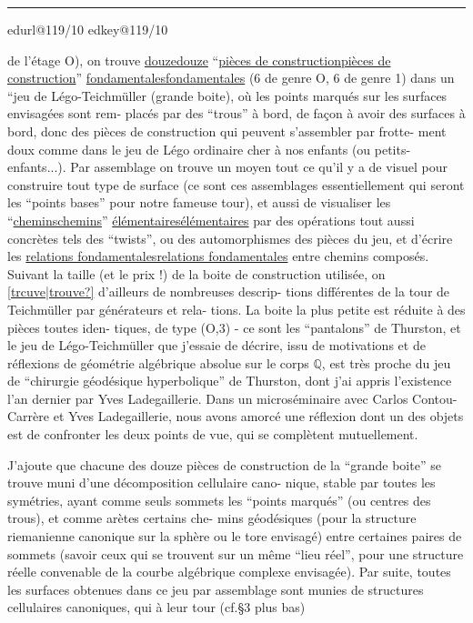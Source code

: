 \documentclass[11pt,a4paper]{article}
\makeatletter
\newif\ifdiplomatic
\newif\ifreading
\newif\ifenglish
\def\CurrentScanURL{}
\def\CurrentPageKey{}
\def\CurrentApparatus{}
\newcounter{appnote}
\newcommand{\scanpage}[1]{%
  \clearpage
  \expandafter\let\expandafter\CurrentScanURL\csname edurl@#1\endcsname
  \expandafter\let\expandafter\CurrentPageKey\csname edkey@#1\endcsname
  \def\CurrentApparatus{}%
  \hypertarget{scan-\CurrentPageKey}{}%
  \typeout{EDITION-SCAN: \CurrentPageKey; PDFPAGE: \the\numexpr\ReadonlyShipoutCounter+1\relax}%
  \ifreading
    \marginnote{\raggedright\scriptsize\sffamily\href{\CurrentScanURL}{119 / \csname edpage@#1\endcsname}}%
  \else
    \noindent{\small\sffamily\href{\CurrentScanURL}{[scan #1]}}\par\smallskip
  \fi}
\newcommand{\mspage}[1]{%
  \ifreading\marginnote{\raggedright\scriptsize\sffamily p.\,#1}[2\baselineskip]%
  \else\noindent{\small\sffamily[p.\,#1]}\par\smallskip\fi}
\let\TextUline\uline
\renewcommand{\uline}[1]{\ifmmode\underline{#1}\else\TextUline{#1}\fi}
\newcommand{\unsure}[1]{\href{\CurrentScanURL}{[#1?]}}
\newcommand{\margin}[1]{%
  \sbox{\MarginalTestBox}{\parbox{\marginparwidth}{\raggedright\footnotesize#1}}%
  \ifdim\dimexpr\ht\MarginalTestBox+\dp\MarginalTestBox\relax>3\baselineskip
    \par\smallskip\noindent\begin{minipage}{\linewidth}\hrule\smallskip
    {\footnotesize\textcolor{HandInk}{\ifenglish Marginal note:\else Note marginale :\fi\ #1}}\smallskip\hrule\end{minipage}\par\smallskip
  \else
    \marginnote{\raggedright\footnotesize\textcolor{HandInk}{#1}}%
  \fi}
\newcommand{\AppItem}[2]{\par\noindent\textsuperscript{#1}\csname edvariant@#2\endcsname}
\newcommand{\EditionApp}[1]{%
  \stepcounter{appnote}%
  \ifmmode{}^{\scriptscriptstyle\theappnote}\else\textsuperscript{\theappnote}\fi
  \begingroup\edef\x{\endgroup\noexpand\gappto\noexpand\CurrentApparatus{\noexpand\AppItem{\theappnote}{#1}}}\x}
\newcommand{\var}[4]{\ifdiplomatic#1\else#2\ifreading\else\EditionApp{#4}\fi\fi}
\newcommand{\finishscan}{\ifx\CurrentApparatus\empty\else\par\bigskip\noindent\rule{.35\linewidth}{.35pt}\par\smallskip{\footnotesize\setlength{\parskip}{3pt}\CurrentApparatus}\fi}
\makeatother
\begin{document}
\margin{9}

\finishscan
\scanpage{119/10}
\mspage{8}

de l'étage O), on trouve \uline{douze} ``\uline{pièces de construction}'' \uline{fondamentales}
(6 de genre O, 6 de genre 1) dans un ``jeu de Légo-Teichmüller (grande
boite), où les points marqués sur les surfaces envisagées sont rem-%
placés par des ``trous'' à bord, de façon à avoir des surfaces à bord,
donc des pièces de construction qui peuvent s'assembler par frotte-%
ment doux comme dans le jeu de Légo ordinaire cher à nos enfants
(ou petits-enfants...). Par assemblage on trouve un moyen tout ce
qu'il y a de visuel pour construire tout type de surface (ce sont
ces assemblages essentiellement qui seront les ``points bases'' pour
notre fameuse tour), et aussi de visualiser les ``\uline{chemins}'' \uline{élémentaires}
par des opérations tout aussi concrètes tels des ``twists'', ou des
automorphismes des pièces du jeu, et d'écrire les \uline{relations fondamentales}
entre chemins composés. Suivant la taille (et le prix !) de la boite
de construction utilisée, on \unsure{trcuve|trouve} d'ailleurs de nombreuses descrip-%
tions différentes de la tour de Teichmüller par générateurs et rela-%
tions. La boite la plus petite est réduite à des pièces toutes iden-%
tiques, de type (O,3) - ce sont les ``pantalons'' de Thurston, et le
jeu de Légo-Teichmüller que j'essaie de décrire, issu de motivations
et de réflexions de géométrie algébrique absolue sur le corps $\mathbb{Q}$,
est très proche du jeu de ``chirurgie géodésique hyperbolique'' de
Thurston, dont j'ai appris l'existence l'an dernier par Yves Ladegaillerie.
Dans un microséminaire avec Carlos Contou-Carrère et Yves \var{Ladegraillerie}{Ladegaillerie}{slip corrected}{V-FR-010-001},
nous avons amorcé une réflexion dont un des objets est de confronter
les deux points de vue, qui se complètent mutuellement.

J'ajoute que chacune des douze pièces de construction de
la ``grande boite'' se trouve muni d'une décomposition cellulaire cano-%
nique, stable par toutes les symétries, ayant comme seuls sommets les
``points marqués'' (ou centres des trous), et comme arètes certains che-%
mins géodésiques (pour la structure riemanienne canonique sur la sphère
ou le tore envisagé) entre certaines paires de sommets (savoir ceux
qui se trouvent sur un même ``lieu réel'', pour une structure réelle
convenable de la courbe algébrique complexe envisagée). Par suite,
toutes les surfaces obtenues dans ce jeu par assemblage sont munies
de structures cellulaires canoniques, qui à leur tour (cf.§3 plus bas)
\end{document}
